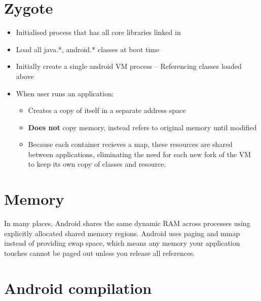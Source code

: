 \documentclass{article}
\begin{document}
\section{Zygote}
\begin{itemize}
  \item Initialised process that has all core libraries linked in
  \item Load all java.*, android.* classes at boot time
  \item Initially create a single android VM process – Referencing classes loaded above
  \item When user runs an application:
  \begin{itemize}
    \item Creates a copy of itself in a separate address space
    \item \textbf{Does not} copy memory, instead refers to original memory until modified
    \item Because each container recieves a map, these resources are shared between applications, eliminating the need for each new fork of the VM to keep its own copy of classes and resource.
  \end{itemize}
\end{itemize}

\section{Memory}
\begin{flushleft}
In many places, Android shares the same dynamic RAM across processes using explicitly allocated shared memory regions.
Android uses paging and mmap instead of providing swap space, which means any memory your application touches cannot be paged out unless you release all references.
\end{flushleft}

\section{Android compilation}
\end{document}
